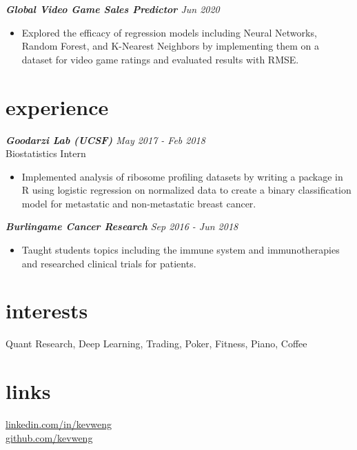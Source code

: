 \documentclass[margin, 12pt]{res} %
\begin{document}
\begin{resume}
{\sl {\bf Global Video Game Sales Predictor} \hfill Jun 2020}
\begin{itemize}  \itemsep -1pt
\item Explored the efficacy of regression models including Neural Networks, Random Forest, and K-Nearest Neighbors by implementing them on a dataset for video game ratings and evaluated results with RMSE.
\end{itemize} 


\section{\large experience}

{\sl {\bf {Goodarzi Lab (UCSF)}} \hfill May 2017 - Feb 2018} \\
Biostatistics Intern
\begin{itemize} \itemsep -1pt %
\item Implemented analysis of ribosome profiling datasets by writing a package in R using logistic regression on normalized data to create a binary classification model for metastatic and non-metastatic breast cancer.
\end{itemize}
 
{\sl {\bf Burlingame Cancer Research} \hfill Sep 2016 - Jun 2018}
\begin{itemize}  \itemsep -1pt
\item Taught students topics including the immune system and immunotherapies and researched clinical trials for patients.
\end{itemize} 




\section{\large interests}
Quant Research, Deep Learning, Trading, Poker, Fitness, Piano, Coffee

\section{\large links}

\href{https://www.linkedin.com/in/kevweng/}{linkedin.com/in/kevweng}\\
\href{https://github.com/kevweng}{github.com/kevweng}\\
\end{resume}
\end{document}
